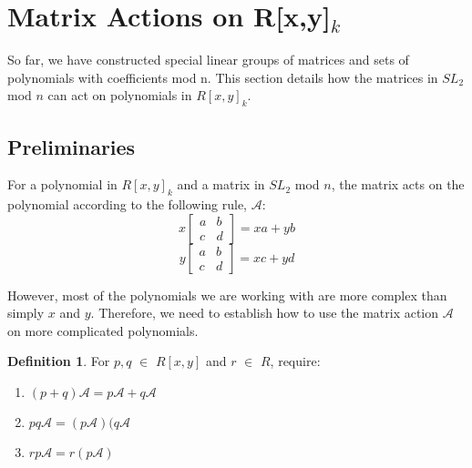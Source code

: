 \documentclass[a4paper,draft]{amsproc}
\theoremstyle{plain}
\theoremstyle{definition}
\newtheorem{dfn}{Definition}[section]
\theoremstyle{remark}
\numberwithin{equation}{section}
\begin{document}
\section{Matrix Actions on R[x,y]$_{k}$} 
So far, we have constructed special linear groups of matrices and sets of polynomials with coefficients mod n. This section details how the matrices in $SL_{2}$ mod $n$ can act on polynomials in $R[x,y]_{k}$. 

\subsection{Preliminaries}
For a polynomial in $R[x,y]_{k}$ and a matrix in $SL_{2}$ mod $n$, the matrix acts on the polynomial according to the following rule, $\mathcal{A}$: 
$$
x\begin{bmatrix}
 a&b \\ 
 c&d 
\end{bmatrix} = xa + yb 
$$
$$
y\begin{bmatrix}
 a&b \\ 
 c&d 
\end{bmatrix} = xc + yd 
$$

However, most of the polynomials we are working with are more complex than simply $x$ and $y$. Therefore, we need to establish how to use the matrix action $\mathcal{A}$ on more complicated polynomials. 
\begin{dfn}
For $p, q$ $\in$ $R[x,y]$ and $r$ $\in$ $R$, require: 
\begin{enumerate}
\item $(p+q)\mathcal{A} = p\mathcal{A} + q\mathcal{A}$
\item $pq\mathcal{A} = (p\mathcal{A})(q\mathcal{A}$
\item $rp\mathcal{A} = r(p\mathcal{A})$
\end{enumerate}
\end{dfn}
\end{document}
